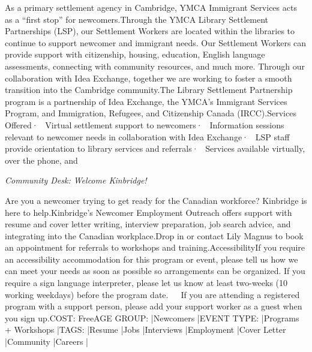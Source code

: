 \documentclass[letterpaper, 10pt]{article}
\newcommand{\subtitle}[1]{\textit{\large #1}\vspace{0.5em}}
\newcommand{\articlecontent}[1]{\small #1\vspace{1em}}
\begin{document}
\begin{multicols}{2}
{
\vspace{10px}

As a primary settlement agency in Cambridge, YMCA Immigrant Services acts as a “first stop” for newcomers.Through the YMCA Library Settlement Partnerships (LSP), our Settlement Workers are located within the libraries to continue to support newcomer and immigrant needs. Our Settlement Workers can provide support with citizenship, housing, education, English language assessments, connecting with community resources, and much more. Through our collaboration with Idea Exchange, together we are working to foster a smooth transition into the Cambridge community.The Library Settlement Partnership program is a partnership of Idea Exchange, the YMCA’s Immigrant Services Program, and Immigration, Refugees, and Citizenship Canada (IRCC).Services Offered·  Virtual settlement support to newcomers·  Information sessions relevant to newcomer needs in collaboration with Idea Exchange·  LSP staff provide orientation to library services and referrals·  Services available virtually, over the phone, and 
}
\vspace{10px}

\subtitle{Community Desk: Welcome Kinbridge!}

\articlecontent{

\qrcode[height=1.5cm]{https://ideaexchange.libnet.info/event/11634047}
\vspace{10px}

Are you a newcomer trying to get ready for the Canadian workforce? Kinbridge is here to help.Kinbridge's Newcomer Employment Outreach offers support with resume and cover letter writing, interview preparation, job search advice, and integrating into the Canadian workplace.Drop in or contact Lily Magnus to book an appointment for referrals to workshops and training.AccessibilityIf you require an accessibility accommodation for this program or event, please tell us how we can meet your needs as soon as possible so arrangements can be organized. If you require a sign language interpreter, please let us know at least two-weeks (10 working weekdays) before the program date.   If you are attending a registered program with a support person, please add your support worker as a guest when you sign up.COST: FreeAGE GROUP: |Newcomers |EVENT TYPE: |Programs + Workshops |TAGS: |Resume |Jobs |Interviews |Employment |Cover Letter |Community |Careers |
}
\vspace{10px}


\end{multicols}
\end{document}
